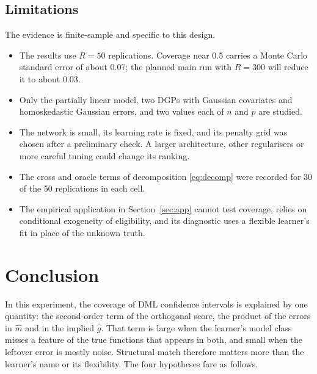 \documentclass[11pt,a4paper]{article}
\begin{document}
\subsection{Limitations}

The evidence is finite-sample and specific to this design.
\begin{itemize}
\item The results use $R=50$ replications. Coverage near 0.5 carries a Monte Carlo standard error of about 0.07; the planned main run with $R=300$ will reduce it to about 0.03.
\item Only the partially linear model, two DGPs with Gaussian covariates and homoskedastic Gaussian errors, and two values each of $n$ and $p$ are studied.
\item The network is small, its learning rate is fixed, and its penalty grid was chosen after a preliminary check. A larger architecture, other regularisers or more careful tuning could change its ranking.
\item The cross and oracle terms of decomposition \eqref{eq:decomp} were recorded for 30 of the 50 replications in each cell.
\item The empirical application in Section~\ref{sec:app} cannot test coverage, relies on conditional exogeneity of eligibility, and its diagnostic uses a flexible learner's fit in place of the unknown truth.
\end{itemize}

\section{Conclusion}\label{sec:concl}

In this experiment, the coverage of DML confidence intervals is explained by one quantity: the second-order term of the orthogonal score, the product of the errors in $\hat m$ and in the implied $\hat g$. That term is large when the learner's model class misses a feature of the true functions that appears in both, and small when the leftover error is mostly noise. Structural match therefore matters more than the learner's name or its flexibility. The four hypotheses fare as follows.
\end{document}
